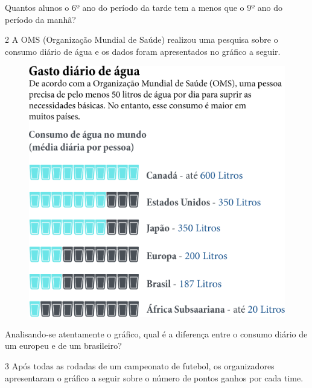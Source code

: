 \pagebreak
Quantos alunos o 6º ano do período da tarde tem a menos que o 9º
ano do período da manhã?

\begin{mdframed}[linewidth=2pt,linecolor=salmao,roundcorner=2pt]
\vspace{2cm}
\end{mdframed}

\num{2} A OMS (Organização Mundial de Saúde) realizou uma pesquisa sobre o
consumo diário de água e os dados foram apresentados no gráfico a seguir.

\begin{figure}[htpb!]
\centering
\includegraphics[width=.9\textwidth]{media/image42.png}
\end{figure}

\pagebreak
Analisando-se atentamente o gráfico, qual é a diferença entre o
consumo diário de um europeu e de um brasileiro?

\begin{mdframed}[linewidth=2pt,linecolor=salmao,roundcorner=2pt]
\vspace{2cm}
\end{mdframed}

\num{3} Após todas as rodadas de um campeonato de futebol, os organizadores
apresentaram o gráfico a seguir sobre o número de pontos ganhos por cada
time.

